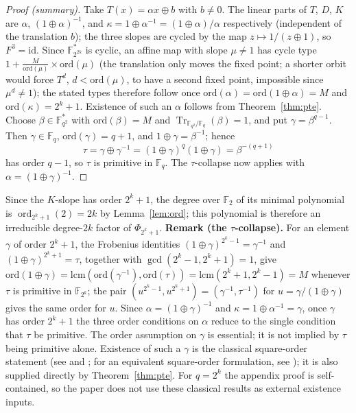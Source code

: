 \documentclass[11pt]{article}
\begin{document}
\begin{proof}[Proof (summary)]
Take $T(x)=\alpha x\oplus b$ with $b\ne0$. The linear parts of $T$, $D$, $K$ are
$\alpha$, $(1\oplus\alpha)^{-1}$, and
$\kappa=1\oplus\alpha^{-1}=(1\oplus\alpha)/\alpha$
respectively (independent of the translation $b$); the three slopes are cycled by
the map $z\mapsto 1/(z\oplus1)$, so $F^3=\mathrm{id}$. Since
$\mathbb{F}_{2^{2k}}^*$ is cyclic, an affine map with slope $\mu\ne1$ has cycle type
$1+\frac{M}{\mathrm{ord}(\mu)}\times\mathrm{ord}(\mu)$ (the translation only moves the
fixed point; a shorter orbit would force $T^d$, $d<\mathrm{ord}(\mu)$, to have a second
fixed point, impossible since $\mu^d\ne1$); the stated types therefore follow once
$\mathrm{ord}(\alpha)=\mathrm{ord}(1\oplus\alpha)=M$ and
$\mathrm{ord}(\kappa)=2^k+1$. Existence of such an $\alpha$ follows from Theorem~\ref{thm:pte}. Choose
$\beta\in\mathbb{F}_{q^2}^*$ with
$\mathrm{ord}(\beta)=M$ and $\operatorname{Tr}_{\mathbb{F}_{q^2}/\mathbb{F}_q}(\beta)=1$,
and put $\gamma=\beta^{q-1}$. Then $\gamma\in\mathbb{F}_q$,
$\mathrm{ord}(\gamma)=q+1$, and $1\oplus\gamma=\beta^{-1}$; hence
\[
\tau=\gamma\oplus\gamma^{-1}
=(1\oplus\gamma)^q(1\oplus\gamma)
=\beta^{-(q+1)}
\]
has order $q-1$, so $\tau$ is primitive in $\mathbb{F}_q$. The $\tau$-collapse
now applies with $\alpha=(1\oplus\gamma)^{-1}$.
\end{proof}
Since the $K$-slope has order $2^k+1$, the degree over $\mathbb{F}_2$ of its
minimal polynomial is $\operatorname{ord}_{2^k+1}(2)=2k$ by
Lemma~\ref{lem:ord}; this polynomial is therefore an irreducible degree-$2k$
factor of $\Phi_{2^k+1}$.
\textbf{Remark (the $\tau$-collapse).}
For an element $\gamma$ of order $2^k+1$, the Frobenius identities
$(1\oplus\gamma)^{2^k-1}=\gamma^{-1}$ and $(1\oplus\gamma)^{2^k+1}=\tau$,
together with $\gcd(2^k-1,2^k+1)=1$, give
$\mathrm{ord}(1\oplus\gamma)=\mathrm{lcm}(\mathrm{ord}(\gamma^{-1}),\mathrm{ord}(\tau))
=\mathrm{lcm}(2^k+1,2^k-1)=M$ whenever $\tau$ is primitive in $\mathbb{F}_{2^k}$;
the pair $(u^{2^k-1},u^{2^k+1})=(\gamma^{-1},\tau^{-1})$ for
$u=\gamma/(1\oplus\gamma)$ gives the same order for $u$. Since
$\alpha=(1\oplus\gamma)^{-1}$ and
$\kappa=1\oplus\alpha^{-1}=\gamma$, once $\gamma$
has order $2^k+1$ the three order conditions on $\alpha$ reduce to the single
condition that $\tau$ be primitive. The order assumption on $\gamma$ is
essential; it is not implied by $\tau$ being primitive alone.
Existence of such a $\gamma$ is the classical square-order statement
(see \cite{Mor} and \cite[Theorem~1, p.~1]{Coh90}; for an equivalent square-order formulation, see
\cite[Theorem~1.5, p.~170]{Coh}); it is also supplied directly by
Theorem~\ref{thm:pte}.
For $q=2^k$ the appendix proof is self-contained, so the paper does not use these
classical results as external existence inputs.
\end{document}
